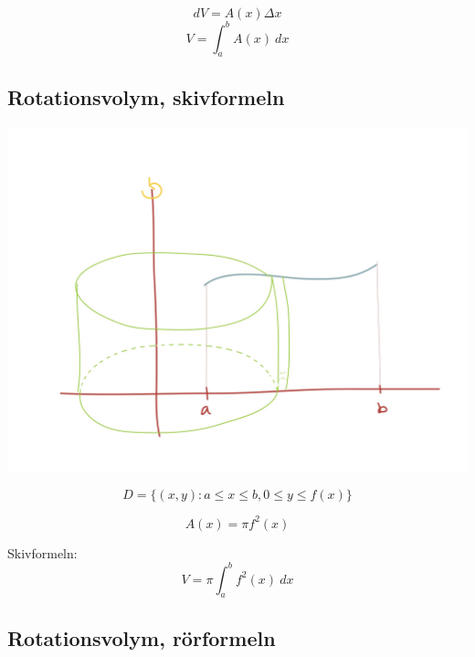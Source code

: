 \documentclass{article}
\begin{document}
$$ dV = A(x)\Delta x $$
$$ V=\int^b_a{A(x)\ dx} $$

\subsection{Rotationsvolym, skivformeln}

\includegraphics[scale=0.15]{img/img15.jpg}

$$ D=\{ (x,y) : a\le x\le b, 0\le y\le f(x) \} $$

$$A(x) = \pi f^2(x) $$

Skivformeln:
$$ V=\pi\int^b_a{f^2(x)\ dx} $$

\subsection{Rotationsvolym, rörformeln}
\end{document}
